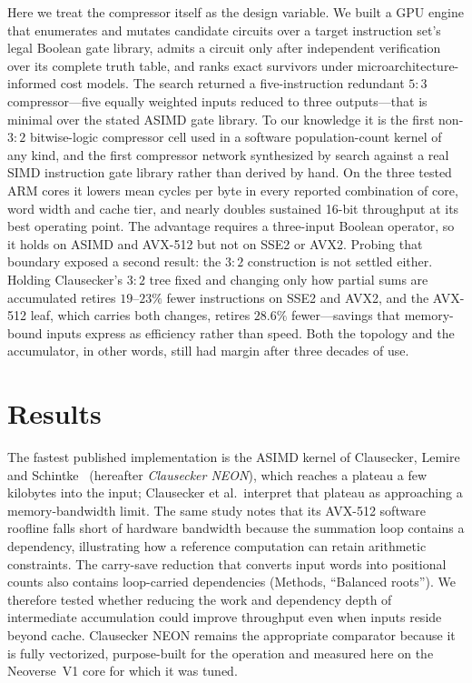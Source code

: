 \documentclass[fleqn,10pt]{wlscirep}
\begin{document}
Here we treat the compressor itself as the design variable. We built a GPU engine that enumerates and mutates candidate circuits over a target instruction set's legal Boolean gate library, admits a circuit only after independent verification over its complete truth table, and ranks exact survivors under microarchitecture-informed cost models. The search returned a five-instruction redundant $5{:}3$ compressor---five equally weighted inputs reduced to three outputs---that is minimal over the stated ASIMD gate library. To our knowledge it is the first non-$3{:}2$ bitwise-logic compressor cell used in a software population-count kernel of any kind, and the first compressor network synthesized by search against a real SIMD instruction gate library rather than derived by hand. On the three tested ARM cores it lowers mean cycles per byte in every reported combination of core, word width and cache tier, and nearly doubles sustained 16-bit throughput at its best operating point. The advantage requires a three-input Boolean operator, so it holds on ASIMD and AVX-512 but not on SSE2 or AVX2. Probing that boundary exposed a second result: the $3{:}2$ construction is not settled either. Holding Clausecker's $3{:}2$ tree fixed and changing only how partial sums are accumulated retires $19$--$23\%$ fewer instructions on SSE2 and AVX2, and the AVX-512 leaf, which carries both changes, retires $28.6\%$ fewer---savings that memory-bound inputs express as efficiency rather than speed. Both the topology and the accumulator, in other words, still had margin after three decades of use.

\section*{Results}

The fastest published implementation is the ASIMD kernel of Clausecker, Lemire and Schintke~\cite{clausecker2024} (hereafter \emph{Clausecker NEON}), which reaches a plateau a few kilobytes into the input; Clausecker et al.\ interpret that plateau as approaching a memory-bandwidth limit. The same study notes that its AVX-512 software roofline falls short of hardware bandwidth because the summation loop contains a dependency, illustrating how a reference computation can retain arithmetic constraints. The carry-save reduction that converts input words into positional counts also contains loop-carried dependencies (Methods, ``Balanced roots''). We therefore tested whether reducing the work and dependency depth of intermediate accumulation could improve throughput even when inputs reside beyond cache. Clausecker NEON remains the appropriate comparator because it is fully vectorized, purpose-built for the operation and measured here on the Neoverse~V1 core for which it was tuned.
\end{document}
